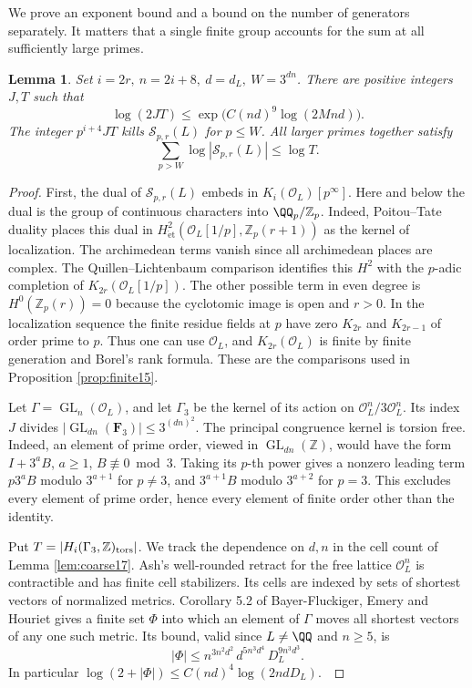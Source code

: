 \documentclass[a4paper,11pt]{article}
\newtheorem{lemma}[proposition]{Lemma}
\theoremstyle{definition}
\theoremstyle{remark}
\newcommand{\ZZ}{\mathbb Z}\newcommand{\ord}{\operatorname{ord}}
\numberwithin{equation}{section}
\newcommand{\Sel}{\mathcal S}
\newcommand{\GL}{\operatorname{GL}}
\newcommand{\OO}{\mathcal O}
\begin{document}
We prove an exponent bound and a bound on the number of generators separately. It matters that a single finite group accounts for the sum at all sufficiently large primes.

\begin{lemma}\label{lem:top}
Set \(i=2r,\ n=2i+8,\ d=d_L,\ W=3^{dn}\). There are positive integers \(J,T\) such that
\[
 \log(2JT)\le\exp\!\big(C(nd)^9\log(2Mnd)\big).
\]
The integer \(p^{i+4}JT\) kills \(\Sel_{p,r}(L)\) for \(p\le W\). All larger primes together satisfy
\[
          \sum_{p>W}\log|\Sel_{p,r}(L)|\le\log T .
\]
\end{lemma}
\begin{proof}
First, the dual of \(\Sel_{p,r}(L)\) embeds in \(K_i(\OO_L)[p^\infty]\). Here and below the dual is the group of continuous characters into \(\QQ_p/\ZZ_p\). Indeed, Poitou--Tate duality places this dual in \(H^2_{\mathrm{\acute et}}(\OO_L[1/p],\ZZ_p(r+1))\) as the kernel of localization. The archimedean terms vanish since all archimedean places are complex. The Quillen--Lichtenbaum comparison identifies this \(H^2\) with the \(p\)-adic completion of \(K_{2r}(\OO_L[1/p])\). The other possible term in even degree is \(H^0(\ZZ_p(r))=0\) because the cyclotomic image is open and \(r>0\). In the localization sequence the finite residue fields at \(p\) have zero \(K_{2r}\) and \(K_{2r-1}\) of order prime to \(p\). Thus one can use \(\OO_L\), and \(K_{2r}(\OO_L)\) is finite by finite generation and Borel's rank formula. These are the comparisons used in Proposition \ref{prop:finite15}.~\cite{IV-II-II-duality13,IV-II-III-weibel,IV-II-III-kahn}

Let \(\Gamma=\GL_n(\OO_L)\), and let \(\Gamma_3\) be the kernel of its action on \(\OO_L^n/3\OO_L^n\). Its index \(J\) divides \(|\GL_{dn}(\mathbf F_3)|\le3^{(dn)^2}\). The principal congruence kernel is torsion free. Indeed, an element of prime order, viewed in \(\GL_{dn}(\ZZ)\), would have the form \(I+3^aB\), \(a\ge1\), \(B\not\equiv0\bmod3\). Taking its \(p\)-th power gives a nonzero leading term \(p3^aB\) modulo \(3^{a+1}\) for \(p\ne3\), and \(3^{a+1}B\) modulo \(3^{a+2}\) for \(p=3\). This excludes every element of prime order, hence every element of finite order other than the identity.

Put \(T=|H_i(\Gamma_3,\ZZ)_{\rm tors}|\). We track the dependence on \(d,n\) in the cell count of Lemma \ref{lem:coarse17}. Ash's well-rounded retract for the free lattice \(\OO_L^n\) is contractible and has finite cell stabilizers. Its cells are indexed by sets of shortest vectors of normalized metrics. Corollary 5.2 of Bayer-Fluckiger, Emery and Houriet gives a finite set \(\Phi\) into which an element of \(\Gamma\) moves all shortest vectors of any one such metric. Its bound, valid since \(L\ne\QQ\) and \(n\ge5\), is
\[
 |\Phi|\le n^{3n^2d^2}\,d^{5n^3d^4}\,D_L^{9n^3d^3}.
\]
In particular \(\log(2+|\Phi|)\le C(nd)^4\log(2ndD_L)\).~\cite[Sec.~2 and Cor.~5.2]{IV-II-III-beh}


\end{proof}
\end{document}
